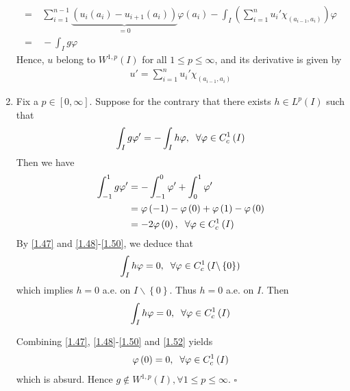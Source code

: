 \documentclass[a4paper,oneside]{article}
\numberwithin{equation}{section}
\begin{document}
\begin{enumerate}
\begin{align}
=&\ \sum\limits_{i = 1}^{n - 1} {\underbrace {\left( {{u_i}\left( {{a_i}} \right) - {u_{i + 1}}\left( {{a_i}} \right)} \right)}_{ = 0}\varphi \left( {{a_i}} \right)}  - \int_I {\left( {\sum\limits_{i = 1}^n {{u_i}'{\chi _{\left( {{a_{i - 1}},{a_i}} \right)}}} } \right)\varphi } \\
=&\  - \int_I {g\varphi } 
\end{align}
Hence, $u$ belong to $W^{1,p}\left(I\right)$ for all $1 \le p \le \infty$, and its derivative is given by
\begin{align}
u' = \sum\limits_{i = 1}^n {{u_i}'{\chi _{\left( {{a_{i - 1}},{a_i}} \right)}}} 
\end{align}
\item Fix a $p\in \left[0,\infty\right]$. Suppose for the contrary that there exists $h \in {L^p}\left( I \right)$ such that
\begin{align}
\label{1.47}
\int_I {g\varphi '}  =  - \int_I {h\varphi } ,\hspace{0.2cm}\forall \varphi  \in C_c^1\left( I \right)
\end{align}
Then we have
\begin{align}
\label{1.48}
\int_{ - 1}^1 {g\varphi '}  &=  - \int_{ - 1}^0 {\varphi '}  + \int_0^1 {\varphi '} \\
 &= \varphi \left( { - 1} \right) - \varphi \left( 0 \right) + \varphi \left( 1 \right) - \varphi \left( 0 \right)\\
 &=  - 2\varphi \left( 0 \right),\hspace{0.2cm}\forall \varphi  \in C_c^1\left( I \right) \label{1.50}
\end{align}
By \eqref{1.47} and \eqref{1.48}-\eqref{1.50}, we deduce that
\begin{align}
\int_I {h\varphi }  = 0,\hspace{0.2cm}\forall \varphi  \in C_c^1\left( {I\backslash \left\{ 0 \right\}} \right)
\end{align}
which implies $h=0$ a.e. on $I\backslash \left\{ 0 \right\}$. Thus $h=0$ a.e. on $I$. Then
\begin{align}
\label{1.52}
\int_I {h\varphi }  = 0,\hspace{0.2cm}\forall \varphi  \in C_c^1\left( I \right)
\end{align}

Combining \eqref{1.47}, \eqref{1.48}-\eqref{1.50} and \eqref{1.52} yields
\begin{align}
\varphi \left( 0 \right) = 0,\hspace{0.2cm}\forall \varphi  \in C_c^1\left( I \right)
\end{align}
which is absurd. Hence $g \notin {W^{1,p}}\left( I \right),\forall 1 \le p \le \infty $. \hfill $\square$\end{enumerate}
\end{document}
